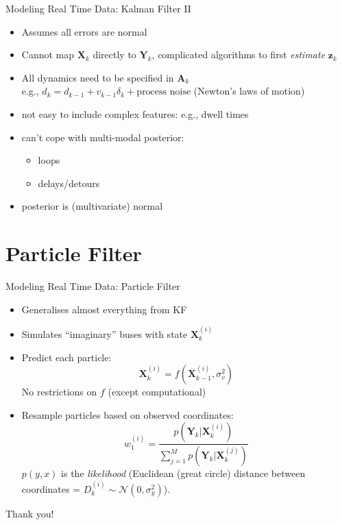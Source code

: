 \documentclass[10pt,t]{beamer}
\newcommand{\bX}{\mathbf{X}}
\newcommand{\bY}{\mathbf{Y}}
\newcommand{\mat}[1]{\mathbf{#1}}
\renewcommand{\vec}[1]{\boldsymbol{#1}}
\begin{document}
\begin{frame}{Modeling Real Time Data: Kalman Filter II}
  \onslide<+->
  \begin{itemize}[<+- | alert@+>]
      \item Assumes all errors are normal

      \item Cannot map $\bX_k$ directly to $\bY_k$,
        complicated algorithms to first \emph{estimate} $\vec{z}_k$

      \item All dynamics need to be specified in $\mat{A}_k$\\
        e.g., $d_k = d_{k-1} + v_{k-1}\delta_k + \text{process noise}$
        (Newton's laws of motion)

      \item not easy to include complex features:
        e.g., dwell times

      \item can't cope with multi-modal posterior:
        \begin{itemize}[<1->]
          \item loops
          \item delays/detours
        \end{itemize}

      \item posterior is (multivariate) normal
  \end{itemize}
  \onslide<+->
\end{frame}


\section{Particle Filter}

\begin{frame}{Modeling Real Time Data: Particle Filter}
  \onslide<+->
  \begin{itemize}[<+- | alert@+>]
    \item Generalises almost everything from KF

    \item Simulates ``imaginary'' buses with state $\bX_k^{(i)}$

    \item Predict each particle:
      \begin{equation*}
        \bX_k^{(i)} = f(\bX_{k-1}^{(i)}, \sigma_v^2)
      \end{equation*}
      No restrictions on $f$ (except computational)

    \item Resample particles based on observed coordinates:
      \begin{equation*}
        w_1^{(i)} = \frac{p(\bY_k | \bX_k^{(i)})}{\sum_{j=1}^M p(\bY_k | \bX_k^{(j)})}
      \end{equation*}
      $p(y,x)$ is the \emph{likelihood} (Euclidean (great circle) distance between coordinates = $D_k^{(i)} \sim \mathcal{N}(0, \sigma_y^2)$).
  \end{itemize}
  \onslide<+->
\end{frame}



\begin{frame}[standout]
  Thank you!
\end{frame}
\end{document}
